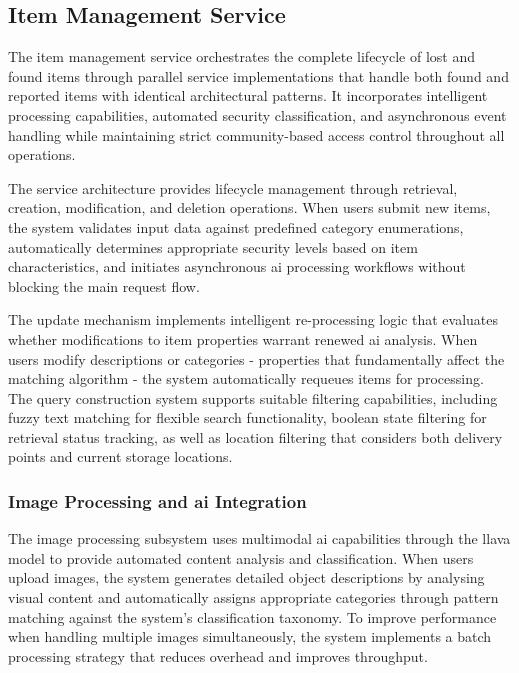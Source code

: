 
\subsection{Item Management Service} \label{subsection:item_management_service}

The item management service orchestrates the complete lifecycle of lost and found items through parallel service implementations that handle both found and reported items with identical architectural patterns. It incorporates intelligent processing capabilities, automated security classification, and asynchronous event handling while maintaining strict community-based access control throughout all operations.

The service architecture provides lifecycle management through retrieval, creation, modification, and deletion operations. When users submit new items, the system validates input data against predefined category enumerations, automatically determines appropriate security levels based on item characteristics, and initiates asynchronous \ac{ai} processing workflows without blocking the main request flow.

The update mechanism implements intelligent re-processing logic that evaluates whether modifications to item properties warrant renewed \ac{ai} analysis. When users modify descriptions or categories - properties that fundamentally affect the matching algorithm - the system automatically requeues items for processing. The query construction system supports suitable filtering capabilities, including fuzzy text matching for flexible search functionality, boolean state filtering for retrieval status tracking, as well as location filtering that considers both delivery points and current storage locations.

\subsubsection{Image Processing and \ac{ai} Integration}

The image processing subsystem uses multimodal \ac{ai} capabilities through the \ac{llava} model to provide automated content analysis and classification. When users upload images, the system generates detailed object descriptions by analysing visual content and automatically assigns appropriate categories through pattern matching against the system's classification taxonomy. To improve performance when handling multiple images simultaneously, the system implements a batch processing strategy that reduces overhead and improves throughput.

